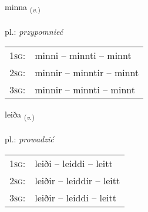 \documentclass[frontgrid, backgrid]{flacards}\usepackage[]{graphicx}\usepackage[]{xcolor}
\begin{document}
\renewcommand{\flhead}{\vskip5pt \fboxsep=0pt {\small\bfseries\footnotesize Sagnorð | czasownik}}
\renewcommand{\fcfoot}{\vskip5pt \fboxsep=0pt \hspace{2pt}{\small\bfseries\footnotesize 1K}}

\renewcommand{\blhead}{\vskip5pt {\small\bfseries\footnotesize Sagnorð | czasownik }}
\renewcommand{\bcfoot}{\vskip5pt \hspace{2pt}{\small\bfseries\footnotesize 1K}}


{minna \small{\textsubscript{(\textit{v.})}} \\[1ex] %
\textphonetic{[mɪna]} \\
pl.: \emph{przypomnieć} \\  [2ex]
\renewcommand*{\arraystretch}{0.8}
\begin{tabular}{p{1cm}l}
\textsc{1sg}: & minni -- minnti -- minnt \\ 
\textsc{2sg}: & minnir -- minntir -- minnt \\ 
\textsc{3sg}: & minnir -- minnti -- minnt \\ 
\end{tabular}
}

\renewcommand{\flhead}{\vskip5pt \fboxsep=0pt {\small\bfseries\footnotesize Sagnorð | czasownik}}
\renewcommand{\fcfoot}{\vskip5pt \fboxsep=0pt \hspace{2pt}{\small\bfseries\footnotesize 1K}}

\renewcommand{\blhead}{\vskip5pt {\small\bfseries\footnotesize Sagnorð | czasownik }}
\renewcommand{\bcfoot}{\vskip5pt \hspace{2pt}{\small\bfseries\footnotesize 1K}}


{leiða \small{\textsubscript{(\textit{v.})}} \\[1ex] %
\textphonetic{[leiːða]} \\
pl.: \emph{prowadzić} \\  [2ex]
\renewcommand*{\arraystretch}{0.8}
\begin{tabular}{p{1cm}l}
\textsc{1sg}: & leiði -- leiddi -- leitt \\ 
\textsc{2sg}: & leiðir -- leiddir -- leitt \\ 
\textsc{3sg}: & leiðir -- leiddi -- leitt \\ 
\end{tabular}
}
\end{document}
